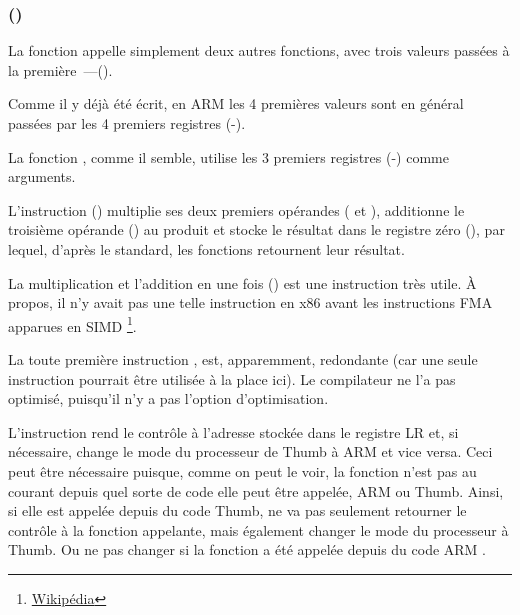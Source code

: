 \subsubsection{\NonOptimizingKeilVI (\ARMMode)}



La fonction \main appelle simplement deux autres fonctions, avec trois valeurs passées
à la première~---(\ttf).

Comme il y déjà été écrit, en ARM les 4 premières valeurs sont en général
passées par les 4 premiers registres (-).

La fonction \ttf, comme il semble, utilise les 3 premiers registres (-) comme arguments. 

L'instruction  () multiplie ses deux premiers opérandes
( et ), additionne le troisième opérande () au produit et stocke
le résultat dans le registre zéro (), par lequel, d'après le standard, les
fonctions retournent leur résultat.

La multiplication et l'addition en une fois ()
est une instruction très utile. À propos, il n'y avait pas une telle instruction en
x86 avant les instructions FMA apparues en SIMD
\footnote{\href{http://go.yurichev.com/17103}{Wikipédia}}.

La toute première instruction , est, apparemment, redondante (car
une seule instruction  pourrait être utilisée à la place ici).
Le compilateur ne l'a pas optimisé, puisqu'il n'y a pas l'option d'optimisation.


L'instruction  rend le contrôle à l'adresse stockée dans le registre \ac{LR}
et, si nécessaire, change le mode du processeur de Thumb à ARM et vice versa.
Ceci peut être nécessaire puisque, comme on peut le voir, la fonction \ttf n'est
pas au courant depuis quel sorte de code elle peut être appelée, ARM ou Thumb.
Ainsi, si elle est appelée depuis du code Thumb,  ne va pas seulement retourner
le contrôle à la fonction appelante, mais également changer le mode du processeur
à Thumb.
Ou ne pas changer si la fonction a été appelée depuis du code ARM .
